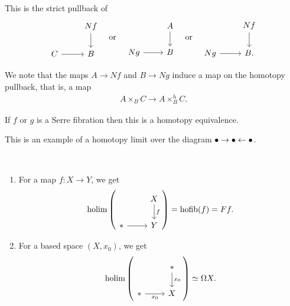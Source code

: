 \documentclass{article}[11pt]
\begin{document}
\begin{note} This is the strict pullback of
\[
	\begin{tikzcd}
	 & Nf\dar \\
	C\rar & B
	\end{tikzcd} \quad \text{or} \quad \begin{tikzcd}
	 & A\dar \\
	Ng\rar & B
	\end{tikzcd}\quad \text{or} \quad \begin{tikzcd}
	 & Nf\dar \\
	Ng\rar & B.
	\end{tikzcd}
\]
\end{note}
We note that the maps $A\to Nf$ and $B\to Ng$ induce a map on the homotopy pullback, that is, a map
\begin{align*}
	A\times_B C \to A\times_B^h C.
\end{align*}

\begin{exercise} If $f$ or $g$ is a Serre fibration then this is a homotopy equivalence.
\end{exercise}

\begin{note} This is an example of a homotopy limit over the diagram $\bullet \to \bullet \leftarrow \bullet$.
\end{note}

\begin{examples} $\ $
\begin{enumerate}
	\item For a map $f: X \to Y$, we get
	\begin{align*}
		\holim  \left( \begin{tikzcd}[ampersand replacement=\&]  \& X\dar["f" right] \\ \ast\rar \& Y \end{tikzcd} \right) = \hofib(f) = Ff.
	\end{align*}

	\item For a based space $(X,x_0)$, we get
	\begin{align*}
	\holim  \left( \begin{tikzcd}[ampersand replacement=\&]  \& \ast\dar["x_0" right] \\ \ast\rar["x_0" below] \& X \end{tikzcd} \right) \simeq \Omega X.
	\end{align*}
\end{enumerate}
\end{examples}
\end{document}
